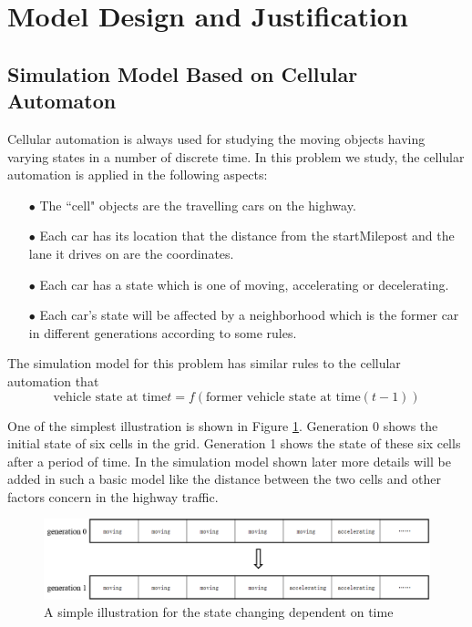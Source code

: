 \documentclass[a4paper]{article}
\begin{document}
	\section{Model Design and Justification}
	\subsection{Simulation Model Based on Cellular Automaton}
	Cellular automation is always used for studying the moving objects having varying states in a number of discrete time. In this problem we study, the cellular automation is applied in the following aspects:
	\begin{enumerate}
		\item[$ \bullet $] The ``cell" objects are the travelling cars on the highway.
		\item[$ \bullet $] Each car has its location that the distance from the startMilepost and the lane it drives on are the coordinates.
		\item[$ \bullet $] Each car has a state which is one of moving, accelerating or decelerating.
		\item[$ \bullet $] Each car's state will be affected by a neighborhood which is the former car in different generations according to some rules.
	\end{enumerate}

	The simulation model for this problem has similar rules to the cellular automation that
	$$ \text{vehicle state at time} t=f(\text{former vehicle state at time} (t-1)) $$

	One of the simplest illustration is shown in Figure \ref{generation}. Generation 0 shows the initial state of six cells in the grid. Generation 1 shows the state of these six cells after a period of time. In the simulation model shown later more details will be added in such a basic model like the distance between the two cells and other factors concern in the highway traffic.

	\begin{figure}[H]
		\centering
		\includegraphics[scale=0.6]{../imgs/generation}
		\caption{A simple illustration for the state changing dependent on time}
		\label{generation}
	\end{figure}
\end{document}
